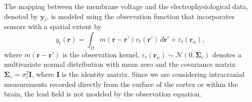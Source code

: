 \documentclass[conference,onecolumn]{IEEEtran}
\begin{document}
The mapping between the membrane voltage and the electrophysiological data, denoted by $\mathbf{y}_t$, is modeled using the observation function that incorporates sensors with a spatial extent by
\begin{equation}\label{eq:ObservationEquation}
	y_t(\mathbf{r}) = \int_{\Omega} { m\left(\mathbf{r}-\mathbf{r}'\right) v_t\left(\mathbf{r}'\right) \, d\mathbf{r}'} + \varepsilon_t(\mathbf{r}_n), 
\end{equation}
where $m\left(\mathbf{r}-\mathbf{r}'\right)$ is the observation kernel, $\varepsilon_t(\mathbf{r}_n) \sim \mathcal{N}\left(0,\boldsymbol{\Sigma}_{\varepsilon}\right)$ denotes a multivariate normal distribution with mean zero and the covariance matrix $\boldsymbol{\Sigma}_{\varepsilon} = \sigma_{\varepsilon}^2\mathbf{I}$, where $\mathbf{I}$ is the identity matrix. Since we are considering intracranial measurements recorded directly from the surface of the cortex or within the brain, the lead field is not modeled by the observation equation.
\end{document}
